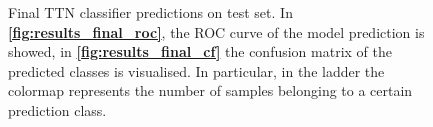 \documentclass[../main/main.tex]{subfiles}
\begin{document}
\begin{figure}[!h]
    \begin{minipage}[c]{0.49\linewidth}
        \vspace{0pt}
        \centering
    \end{minipage}%
    \begin{minipage}[c]{0.50\linewidth}
        \vspace{0pt}
        \centering
    \end{minipage}%
    \caption{Final TTN classifier predictions on test set. In \textbf{\ref{fig:results_final_roc}}, the ROC curve of the model prediction is showed, in \textbf{\ref{fig:results_final_cf}} the confusion matrix of the predicted classes is visualised. In particular, in the ladder the colormap represents the number of samples belonging to a certain prediction class.}
    \label{fig:results_final}
\end{figure}
\end{document}

